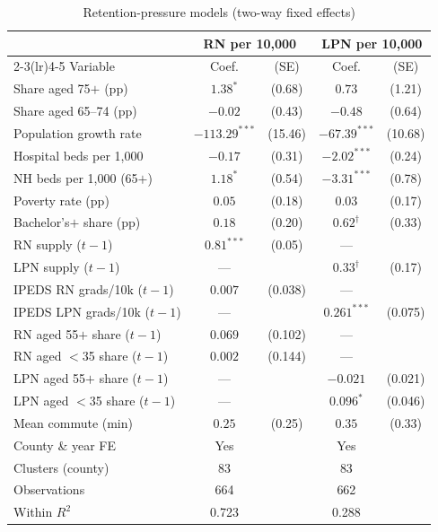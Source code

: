 \begin{table}[!htbp]
\centering
\caption{Retention-pressure models (two-way fixed effects)}
\label{tab:retention}
\small
\begin{tabular}{lcccc}
\toprule
 & \multicolumn{2}{c}{RN per 10{,}000} & \multicolumn{2}{c}{LPN per 10{,}000} \\
\cmidrule(lr){2-3}\cmidrule(lr){4-5}
Variable & Coef. & (SE) & Coef. & (SE) \\
\midrule
Share aged 75$+$ (pp) & $1.38^{*}$ & (0.68) & $0.73$ & (1.21) \\
Share aged 65--74 (pp) & $-0.02$ & (0.43) & $-0.48$ & (0.64) \\
Population growth rate & $-113.29^{***}$ & (15.46) & $-67.39^{***}$ & (10.68) \\
Hospital beds per 1{,}000 & $-0.17$ & (0.31) & $-2.02^{***}$ & (0.24) \\
NH beds per 1{,}000 (65$+$) & $1.18^{*}$ & (0.54) & $-3.31^{***}$ & (0.78) \\
Poverty rate (pp) & $0.05$ & (0.18) & $0.03$ & (0.17) \\
Bachelor's$+$ share (pp) & $0.18$ & (0.20) & $0.62^{\dagger}$ & (0.33) \\
RN supply ($t-1$) & $0.81^{***}$ & (0.05) & --- &  \\
LPN supply ($t-1$) & --- &  & $0.33^{\dagger}$ & (0.17) \\
IPEDS RN grads/10k ($t-1$) & $0.007$ & (0.038) & --- &  \\
IPEDS LPN grads/10k ($t-1$) & --- &  & $0.261^{***}$ & (0.075) \\
RN aged 55$+$ share ($t-1$) & $0.069$ & (0.102) & --- &  \\
RN aged $<$35 share ($t-1$) & $0.002$ & (0.144) & --- &  \\
LPN aged 55$+$ share ($t-1$) & --- &  & $-0.021$ & (0.021) \\
LPN aged $<$35 share ($t-1$) & --- &  & $0.096^{*}$ & (0.046) \\
Mean commute (min) & $0.25$ & (0.25) & $0.35$ & (0.33) \\
\midrule
County \& year FE & Yes & & Yes & \\
Clusters (county) & 83 & & 83 & \\
Observations & 664 & & 662 & \\
Within $R^{2}$ & 0.723 & & 0.288 & \\
\bottomrule
\end{tabular}
\end{table}

